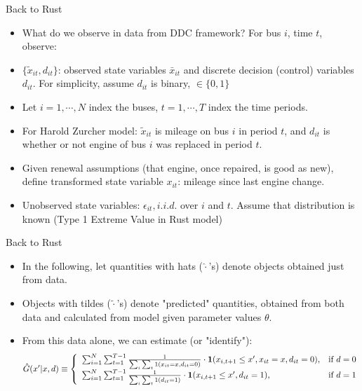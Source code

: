 \begin{frame}{Back to Rust}
\begin{itemize}
\item What do we observe in data from DDC framework? For bus $i$, time $t$, observe:
\item $\{ \tilde x_{it}, d_{it}\}$: observed state variables $\bar x_{it}$ and discrete decision (control) variables $d_{it}$. For simplicity, assume $d_{it}$ is binary, $\in \{0,1\}$
\item Let $i=1, \cdots , N$ index the buses, $t=1, \cdots, T$ index the time periods. 
\item For Harold Zurcher model: $\tilde x_{it}$ is mileage on bus $i$ in period $t$, and $d_{it}$ is whether or not engine of bus $i$ was replaced in period $t$. 
\item Given renewal assumptions (that engine, once repaired, is good as new), define transformed state variable $x_{it}$: mileage since last engine change. 
\item Unobserved state variables: $\epsilon_{it}, i.i.d.$ over $i$ and $t$. Assume that distribution is known (Type 1 Extreme Value in Rust model)
\end{itemize}
\end{frame}

\begin{frame}{Back to Rust}
\begin{itemize}
\item In the following, let quantities with hats ($\hat \cdot$'s) denote objects obtained just from data.
\item Objects with tildes ($\tilde \cdot $'s) denote "predicted" quantities, obtained from both data and calculated from model given parameter values $\theta$. 
\item  From this data alone, we can estimate (or "identify"):
\begin{equation*}
\resizebox{.9999999\hsize}{!}{$ \hat G (x' | x, d) \equiv \left \{
\begin{array}{lc} 
\sum^N_{i=1} \sum^{T-1}_{t=1} \frac{1}{\sum_i \sum_t 1 (x_{it} = x, d_{it} = 0)} \cdot \mathbf{1} (x_{i, t+1} \leq x', x_{it} = x, d_{it} = 0), & \text{if } d = 0 \\
\sum^N_{i=1} \sum^{T-1}_{t=1} \frac{1}{\sum_i \sum_t 1 (d_{it}=1)} \cdot \mathbf{1} (x_{i,t+1} \leq x', d_{it} = 1), & \text{if } d =1
\end{array}
\right . $}
\end{equation*}
\end{itemize}
\end{frame}

